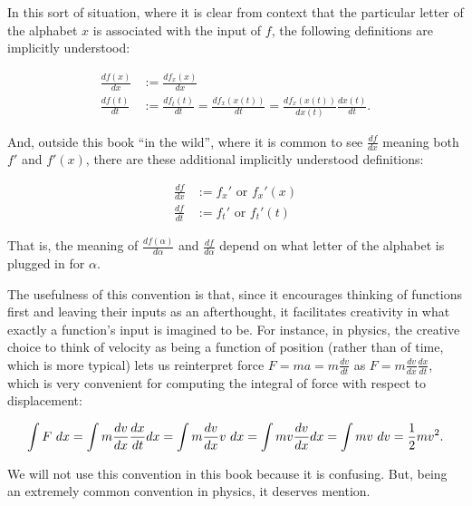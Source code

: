 In this sort of situation, where it is clear from context that the particular letter of the alphabet  $x$ is associated with the input of $f$, the following definitions are implicitly understood:

\begin{align*}
    \frac{df(x)}{dx} &:= \frac{df_x(x)}{dx} \\
    \frac{df(t)}{dt} &:= \frac{df_t(t)}{dt} = \frac{df_x(x(t))}{dt} = \frac{df_x(x(t))}{dx(t)} \frac{dx(t)}{dt}.
\end{align*}

And, outside this book ``in the wild'', where it is common to see $\frac{df}{dx}$ meaning both $f'$ and $f'(x)$, there are these additional implicitly understood definitions:

\begin{align*}
    \frac{df}{dx} &:= f_x' \text{ or } f_x'(x) \\
    \frac{df}{dt} &:= f_t' \text{ or } f_t'(t)
\end{align*}

That is, the meaning of $\frac{df(\alpha)}{d\alpha}$ and $\frac{df}{d\alpha}$ depend on what letter of the alphabet is plugged in for $\alpha$.

The usefulness of this convention is that, since it encourages thinking of functions first and leaving their inputs as an afterthought, it facilitates creativity in what exactly a function's input is imagined to be. For instance, in physics, the creative choice to think of velocity as being a function of position (rather than of time, which is more typical) lets us reinterpret force $F = ma = m\frac{dv}{dt}$ as $F = m\frac{dv}{dx}\frac{dx}{dt}$, which is very convenient for computing the integral of force with respect to displacement:

\begin{align*}
    \int F \text{ } dx = \int m \frac{dv}{dx} \frac{dx}{dt} dx = \int m \frac{dv}{dx} v \text{ } dx = \int mv \frac{dv}{dx} dx = \int mv \text{ } dv = \frac{1}{2}mv^2.
\end{align*}

We will not use this convention in this book because it is confusing. But, being an extremely common convention in physics, it deserves mention.

